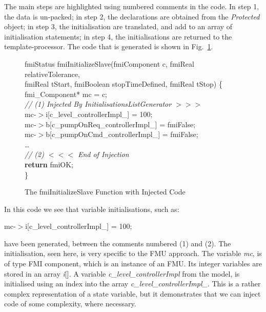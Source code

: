 \documentclass{llncs}%
\begin{document}
The main steps are highlighted using numbered comments in the code. In step 1, the data is un-packed; in step 2, the declarations are obtained from the \emph{Protected} object; in step 3, the initialisation are translated, and add to an array of initialisation statements; in step 4, the initialisations are returned to the template-processor. The code that is generated is shown in Fig.~\ref{fig:codeOut}. 
%
\begin{figure}
\centering
\begin{minipage}{0.9\textwidth}
fmiStatus fmiInitializeSlave(fmiComponent c, fmiReal relativeTolerance,\\
\hspace*{0.6cm}fmiReal tStart, fmiBoolean stopTimeDefined, fmiReal tStop) \{\\
\hspace*{0.2cm}fmi\_Component* mc = c;\\
\hspace*{0.2cm}\emph{// (1) Injected By InitialisationsListGenerator $>>>$ }\\
\hspace*{0.2cm}mc-$>$i[c\_level\_controllerImpl\_] = 100;\\
\hspace*{0.2cm}mc-$>$b[c\_pumpOnReq\_controllerImpl\_] = fmiFalse;\\
\hspace*{0.2cm}mc-$>$b[c\_pumpOnCmd\_controllerImpl\_] = fmiFalse;\\
\hspace*{0.2cm}\ldots\\
\hspace*{0.2cm}\emph{// (2) $<<<$ End of Injection}\\
\hspace*{0.2cm}\textbf{return} fmiOK;\\
\}
\end{minipage}
\caption{The fmiInitializeSlave Function with Injected Code}
\label{fig:codeOut}
\end{figure}
%
In this code we see that variable initialisations, such as:

\vspace*{0.05cm}\noindent\begin{minipage}{\textwidth}
\centering
mc-$>$i[c\_level\_controllerImpl\_] = 100;
\end{minipage}\vspace*{0.05cm}
have been generated, between the comments numbered (1) and (2). The initialisation, seen here, is very specific to the FMU approach. The variable \emph{mc}, is of type FMI component, which is an instance of an FMU. Its integer variables are stored in an array \emph{i}[]. A variable \emph{c\_level\_controllerImpl} from the model, is initialised using an index into the array \emph{c\_level\_controllerImpl\_}. This is a rather complex representation of a state variable,  but it demonstrates that we can inject code of some complexity, where necessary.
\end{document}
